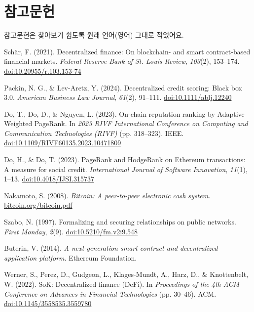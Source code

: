 \clearpage
\chapter{참고문헌}
\label{ch:references}

참고문헌은 찾아보기 쉽도록 원래 언어(영어) 그대로 적었어요.

\begingroup\latinmarks %
\begin{enumerate}[label={[\arabic*]}, leftmargin=*, itemsep=0.35em, parsep=0pt]
  \item{}\label{ref:1} Sch\"{a}r, F. (2021). Decentralized finance: On blockchain- and smart contract-based financial markets. \textit{Federal Reserve Bank of St. Louis Review}, \textit{103}(2), 153--174. \href{https://doi.org/10.20955/r.103.153-74}{doi:10.20955/r.103.153-74}
  \item{}\label{ref:2} Packin, N. G., \& Lev-Aretz, Y. (2024). Decentralized credit scoring: Black box 3.0. \textit{American Business Law Journal}, \textit{61}(2), 91--111. \href{https://doi.org/10.1111/ablj.12240}{doi:10.1111/ablj.12240}
  \item{}\label{ref:3} Do, T., Do, D., \& Nguyen, L. (2023). On-chain reputation ranking by Adaptive Weighted PageRank. In \textit{2023 RIVF International Conference on Computing and Communication Technologies (RIVF)} (pp. 318--323). IEEE. \href{https://doi.org/10.1109/RIVF60135.2023.10471809}{doi:10.1109/RIVF60135.2023.10471809}
  \item{}\label{ref:4} Do, H., \& Do, T. (2023). PageRank and HodgeRank on Ethereum transactions: A measure for social credit. \textit{International Journal of Software Innovation}, \textit{11}(1), 1--13. \href{https://doi.org/10.4018/IJSI.315737}{doi:10.4018/IJSI.315737}
  \item{}\label{ref:5} Nakamoto, S. (2008). \textit{Bitcoin: A peer-to-peer electronic cash system}. \href{https://bitcoin.org/bitcoin.pdf}{bitcoin.org/bitcoin.pdf}
  \item{}\label{ref:6} Szabo, N. (1997). Formalizing and securing relationships on public networks. \textit{First Monday}, \textit{2}(9). \href{https://doi.org/10.5210/fm.v2i9.548}{doi:10.5210/fm.v2i9.548}
  \item{}\label{ref:7} Buterin, V. (2014). \textit{A next-generation smart contract and decentralized application platform}. Ethereum Foundation.
  \item{}\label{ref:8} Werner, S., Perez, D., Gudgeon, L., Klages-Mundt, A., Harz, D., \& Knottenbelt, W. (2022). SoK: Decentralized finance (DeFi). In \textit{Proceedings of the 4th ACM Conference on Advances in Financial Technologies} (pp. 30--46). ACM. \href{https://doi.org/10.1145/3558535.3559780}{doi:10.1145/3558535.3559780}

\end{enumerate}
